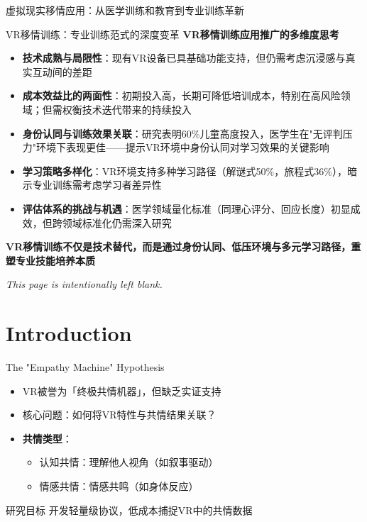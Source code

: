 \documentclass[aspectratio=169,xcolor=dvipsnames]{beamer}
\begin{document}
\begin{frame}{虚拟现实移情应用：从医学训练和教育到专业训练革新}
    \begin{block}{VR移情训练：专业训练范式的深度变革}
        \textbf{VR移情训练应用推广的多维度思考}
        \begin{itemize}
            \item \textbf{技术成熟与局限性}：现有VR设备已具基础功能支持，但仍需考虑沉浸感与真实互动间的差距
            \item \textbf{成本效益比的两面性}：初期投入高，长期可降低培训成本，特别在高风险领域；但需权衡技术迭代带来的持续投入
            \item \textbf{身份认同与训练效果关联}：研究表明60\%儿童高度投入，医学生在"无评判压力"环境下表现更佳——提示VR环境中身份认同对学习效果的关键影响
            \item \textbf{学习策略多样化}：VR环境支持多种学习路径（解谜式50\%，旅程式36\%），暗示专业训练需考虑学习者差异性
            \item \textbf{评估体系的挑战与机遇}：医学领域量化标准（同理心评分、回应长度）初显成效，但跨领域标准化仍需深入研究
        \end{itemize}
        
        \vspace{0.1cm}
        \textbf{VR移情训练不仅是技术替代，而是通过身份认同、低压环境与多元学习路径，重塑专业技能培养本质}
    \end{block}
\end{frame}
\begin{frame}
    \begin{center}
        \textit{This page is intentionally left blank.}
    \end{center}
\end{frame}

\section{Introduction}

\begin{frame}{The "Empathy Machine" Hypothesis}
    \begin{itemize}
        \item VR被誉为「终极共情机器」，但缺乏实证支持
        \item \alert{核心问题}：如何将VR特性与共情结果关联？
        \item \textbf{共情类型}：
            \begin{itemize}
                \item 认知共情：理解他人视角（如叙事驱动）
                \item 情感共情：情感共鸣（如身体反应）
            \end{itemize}
    \end{itemize}
    \begin{block}{研究目标}
        开发轻量级协议，低成本捕捉VR中的共情数据
    \end{block}
\end{frame}
\end{document}
